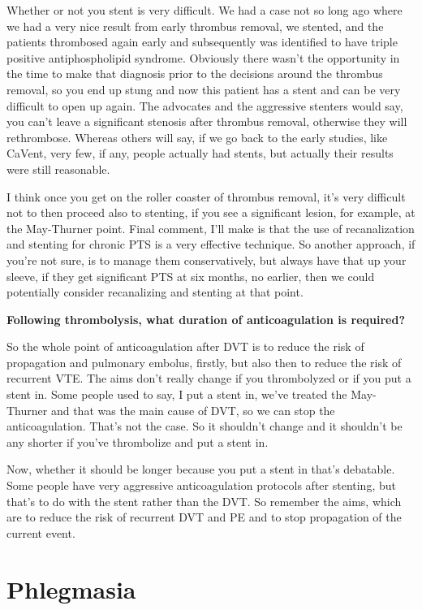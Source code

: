 \documentclass[
]{book}
\begin{document}
Whether or not you stent is very difficult. We had a case not so long
ago where we had a very nice result from early thrombus removal, we
stented, and the patients thrombosed again early and subsequently was
identified to have triple positive antiphospholipid syndrome. Obviously
there wasn't the opportunity in the time to make that diagnosis prior to
the decisions around the thrombus removal, so you end up stung and now
this patient has a stent and can be very difficult to open up again. The
advocates and the aggressive stenters would say, you can't leave a
significant stenosis after thrombus removal, otherwise they will
rethrombose. Whereas others will say, if we go back to the early
studies, like CaVent, very few, if any, people actually had stents, but
actually their results were still reasonable.

I think once you get on the roller coaster of thrombus removal, it's
very difficult not to then proceed also to stenting, if you see a
significant lesion, for example, at the May-Thurner point. Final
comment, I'll make is that the use of recanalization and stenting for
chronic PTS is a very effective technique. So another approach, if
you're not sure, is to manage them conservatively, but always have that
up your sleeve, if they get significant PTS at six months, no earlier,
then we could potentially consider recanalizing and stenting at that
point.

\textbf{Following thrombolysis, what duration of anticoagulation is
required?}

So the whole point of anticoagulation after DVT is to reduce the risk of
propagation and pulmonary embolus, firstly, but also then to reduce the
risk of recurrent VTE. The aims don't really change if you thrombolyzed
or if you put a stent in. Some people used to say, I put a stent in,
we've treated the May-Thurner and that was the main cause of DVT, so we
can stop the anticoagulation. That's not the case. So it shouldn't
change and it shouldn't be any shorter if you've thrombolize and put a
stent in.

Now, whether it should be longer because you put a stent in that's
debatable. Some people have very aggressive anticoagulation protocols
after stenting, but that's to do with the stent rather than the DVT. So
remember the aims, which are to reduce the risk of recurrent DVT and PE
and to stop propagation of the current event.

\hypertarget{phlegmasia}{%
\section{Phlegmasia}\label{phlegmasia}}
\end{document}
